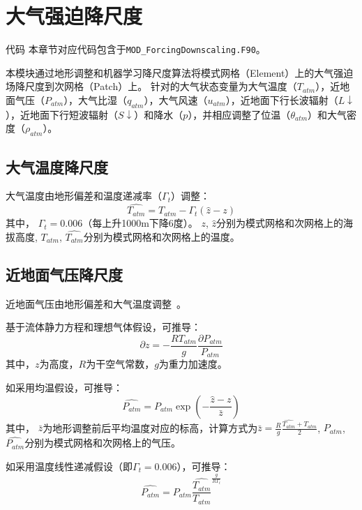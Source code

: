 \chapter{大气强迫降尺度}\label{大气强迫降尺度}
\begin{mymdframed}{代码}
本章节对应代码包含于\texttt{MOD\_ForcingDownscaling.F90}。
\end{mymdframed}

本模块通过地形调整和机器学习降尺度算法将模式网格（Element）上的大气强迫场降尺度到次网格（Patch）上。
针对的大气状态变量为大气温度（$T_{atm}$），近地面气压（$P_{atm}$），大气比湿（$q_{atm}$），大气风速（$u_{atm}$），近地面下行长波辐射（$L↓$），近地面下行短波辐射（$S↓$）和降水（$p$），并相应调整了位温（$\theta_{atm}$）和大气密度（$\rho_{atm}$）。

\section{大气温度降尺度}
大气温度由地形偏差和温度递减率（${\Gamma}_{t}$）调整：
\begin{equation}\label{T_atm}
\hat{T_{atm}}=T_{atm}-{\Gamma}_{t} \left(\hat{z}-z\right)
\end{equation}
其中，
${\Gamma}_{t}=0.006$（每上升1000m下降6度）。
$z$, $\hat{z}$分别为模式网格和次网格上的海拔高度,
$T_{atm}$, $\hat{T_{atm}}$分别为模式网格和次网格上的温度。

\section{近地面气压降尺度}
近地面气压由地形偏差和大气温度调整~\citep{Cosgrove2003}。

基于流体静力方程和理想气体假设，可推导：
\begin{equation}
\partial z=-\frac{RT_{atm}}{g}\frac{\partial P_{atm}}{P_{atm}}
\end{equation}
其中，$z$为高度，$R$为干空气常数，$g$为重力加速度。

如采用均温假设，可推导：
\begin{equation}
\hat{P_{atm}}=P_{atm} \exp{\left(-\frac{\hat{z}-z}{\bar{z}}\right)}
\end{equation}
其中，
$\bar{z}$为地形调整前后平均温度对应的标高，计算方式为$\bar{z}=\frac{R}{g} \frac{\hat{T_{atm}}+T_{atm}}{2}$,  
$P_{atm}$, $\hat{P_{atm}}$分别为模式网格和次网格上的气压。

如采用温度线性递减假设（即${\Gamma}_{t}=0.006$），可推导：
\begin{equation}
\hat{P_{atm}}=P_{atm} \frac{\hat{T_{atm}}}{T_{atm}}^\frac{g}{R\Gamma_{t}}
\end{equation}

